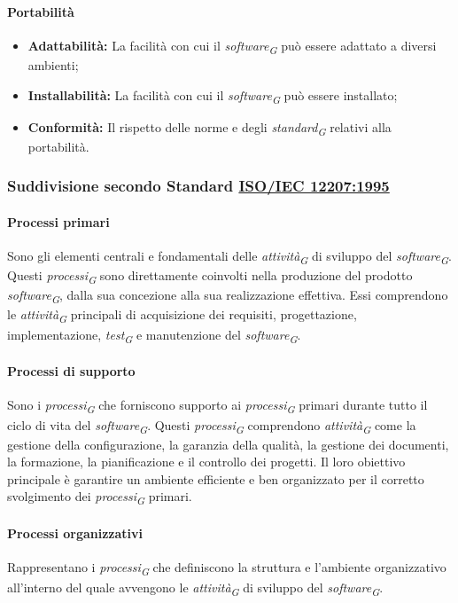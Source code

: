 \paragraph{Portabilità}
\begin{itemize}
    \item \textbf{Adattabilità:} La facilità con cui il \textit{software}\textsubscript{\textit{G}} può essere adattato a diversi ambienti;
    \item \textbf{Installabilità:} La facilità con cui il \textit{software}\textsubscript{\textit{G}} può essere installato;
    \item \textbf{Conformità:} Il rispetto delle norme e degli \textit{standard}\textsubscript{\textit{G}} relativi alla portabilità.
\end{itemize}


\subsubsection{Suddivisione secondo Standard \href{https://www.math.unipd.it/~tullio/IS-1/2009/Approfondimenti/ISO_12207-1995.pdf}{ISO/IEC 12207:1995}}

\paragraph{Processi primari}
Sono gli elementi centrali e fondamentali delle \textit{attività}\textsubscript{\textit{G}} di sviluppo del \textit{software}\textsubscript{\textit{G}}. Questi \textit{processi}\textsubscript{\textit{G}} sono direttamente coinvolti nella produzione del prodotto \textit{software}\textsubscript{\textit{G}}, dalla sua concezione alla sua realizzazione effettiva. Essi comprendono le \textit{attività}\textsubscript{\textit{G}} principali di acquisizione dei requisiti, progettazione, implementazione, \textit{test}\textsubscript{\textit{G}} e manutenzione del \textit{software}\textsubscript{\textit{G}}.

\paragraph{Processi di supporto}
Sono i \textit{processi}\textsubscript{\textit{G}} che forniscono supporto ai \textit{processi}\textsubscript{\textit{G}} primari durante tutto il ciclo di vita del \textit{software}\textsubscript{\textit{G}}. Questi \textit{processi}\textsubscript{\textit{G}} comprendono \textit{attività}\textsubscript{\textit{G}} come la gestione della configurazione, la garanzia della qualità, la gestione dei documenti, la formazione, la pianificazione e il controllo dei progetti. Il loro obiettivo principale è garantire un ambiente efficiente e ben organizzato per il corretto svolgimento dei \textit{processi}\textsubscript{\textit{G}} primari.

\paragraph{Processi organizzativi}
Rappresentano i \textit{processi}\textsubscript{\textit{G}} che definiscono la struttura e l'ambiente organizzativo all'interno del quale avvengono le \textit{attività}\textsubscript{\textit{G}} di sviluppo del \textit{software}\textsubscript{\textit{G}}. 
